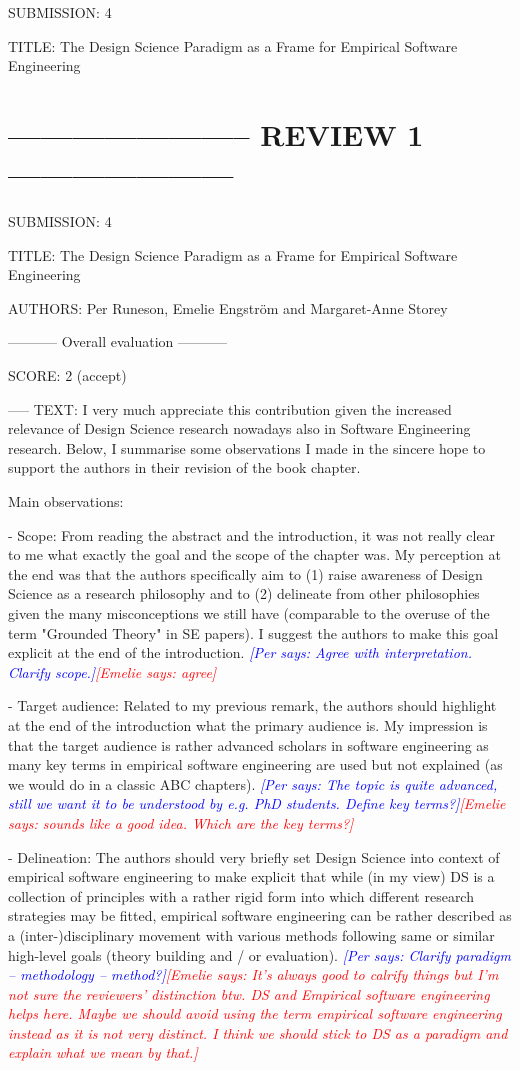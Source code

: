 \documentclass{article}
\newcommand{\emelie}[1]{\textcolor{red}{{\it [Emelie says: #1]}}}
\newcommand{\per}[1]{\textcolor{blue}
        	{{\it [Per says: #1]}}}
\newcommand{\emelie}[1]{}
\newcommand{\per}[1]{}
\begin{document}
SUBMISSION: 4

TITLE: The Design Science Paradigm as a Frame for Empirical Software Engineering


\section*{----------------------- REVIEW 1 ---------------------}

SUBMISSION: 4

TITLE: The Design Science Paradigm as a Frame for Empirical Software Engineering

AUTHORS: Per Runeson, Emelie Engström and Margaret-Anne Storey

----------- Overall evaluation -----------

SCORE: 2 (accept)

----- TEXT:
I very much appreciate this contribution given the increased relevance of Design Science research nowadays also in Software Engineering research. Below, I summarise some observations I made in the sincere hope to support the authors in their revision of the book chapter.

Main observations:

- Scope: From reading the abstract and the introduction, it was not really clear to me what exactly the goal and the scope of the chapter was. My perception at the end was that the authors specifically aim to (1) raise awareness of Design Science as a research philosophy and to (2) delineate from other philosophies given the many misconceptions we still have (comparable to the overuse of the term "Grounded Theory" in SE papers). I suggest the authors to make this goal explicit at the end of the introduction.
\per{Agree with interpretation. Clarify scope.}\emelie{agree}

- Target audience: Related to my previous remark, the authors should highlight at the end of the introduction what the primary audience is. My impression is that the target audience is rather advanced scholars in software engineering as many key terms in empirical software engineering are used but not explained (as we would do in a classic ABC chapters).
\per{The topic is quite advanced, still we want it to be understood by e.g. PhD students. Define key terms?}\emelie{sounds like a good idea. Which are the key terms?}

- Delineation: The authors should very briefly set Design Science into context of empirical software engineering to make explicit that while (in my view) DS is a collection of principles with a rather rigid form into which different research strategies may be fitted, empirical software engineering can be rather described as a (inter-)disciplinary movement with various methods following same or similar high-level goals (theory building and / or evaluation). \per{Clarify paradigm -- methodology -- method?}\emelie{It's always good to calrify things but I'm not sure the reviewers' distinction btw. DS and Empirical software engineering helps here. Maybe we should avoid using the term empirical software engineering instead as it is not very distinct. I think we should stick to DS as a paradigm and explain what we mean by that.}
\end{document}
